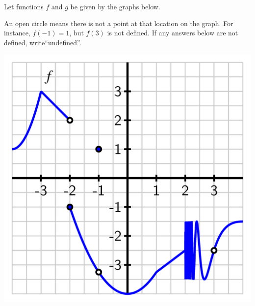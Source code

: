 \documentclass{ximera}
\author{Elizabeth Miller}
\begin{document}
\licenseAPC
\begin{exercise}

Let functions $f$ and $g$ be given by the graphs below. 

An open circle means there is not a point at that location on the
graph.  For instance, $f(-1) = 1$, but $f(3)$ is not defined.  If any
answers below are not defined, write``undefined''.

\begin{image}
\includegraphics{composite-ez-f.png}
\end{image}


\end{exercise}
\end{document}
